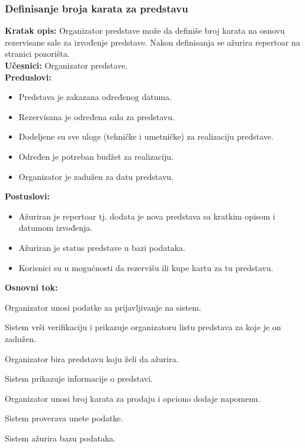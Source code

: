 \documentclass[a4paper]{article}
\begin{document}
\subsubsection{Definisanje broja karata za predstavu}
\noindent\textbf{Kratak opis:} Organizator predstave može da definiše broj karata na osnovu rezervisane
sale za izvođenje predstave. Nakon definisanja se ažurira repertoar na stranici pozorišta.\\

\noindent\textbf{Učesnici:} Organizator predstave.\\

\noindent\textbf{Preduslovi:}
  \begin{itemize}
    \item Predstava je zakazana određenog datuma.
    \item Rezervisana je određena sala za predstavu.
    \item Dodeljene su sve uloge (tehničke i umetničke) za realizaciju predstave.
    \item Određen je potreban budžet za realizaciju.
    \item Organizator je zadužen za datu predstavu.
  \end{itemize}

\noindent\textbf{Postuslovi:} 
  \begin{itemize}
    \item Ažuriran je repertoar tj. dodata je nova predstava sa kratkim opisom i datumom izvođenja.
    \item Ažuriran je status predstave u bazi podataka.
    \item Korisnici su u mogućnosti da rezervišu ili kupe kartu za tu predstavu.
  \end{itemize}

\noindent\textbf{Osnovni tok:}
  \begin{legal}
    \item Organizator unosi podatke za prijavljivanje na sistem.
    \item Sistem vrši verifikaciju i prikazuje organizatoru listu predstava za koje je on zadužen.
    \item Organizator bira predstavu koju želi da ažurira.
    \item Sistem prikazuje informacije o predstavi.
    \item Organizator unosi broj karata za prodaju i opciono dodaje napomenu.
    \item Sistem proverava unete podatke.
    \item Sistem ažurira bazu podataka.
  \end{legal}
\end{document}

